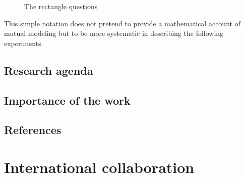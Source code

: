 \documentclass{report}
\begin{document}
\begin{figure*}[htb]
\centering


\caption{The rectangle questions}

\label{mm_rectangle}
\end{figure*}


This simple notation does not pretend to provide a mathematical account of
mutual modeling but to be more systematic in describing the following
experiments. 

\subsection{Research agenda}

\subsection{Importance of the work}

\subsection{References}

\section{International collaboration}
\end{document}
